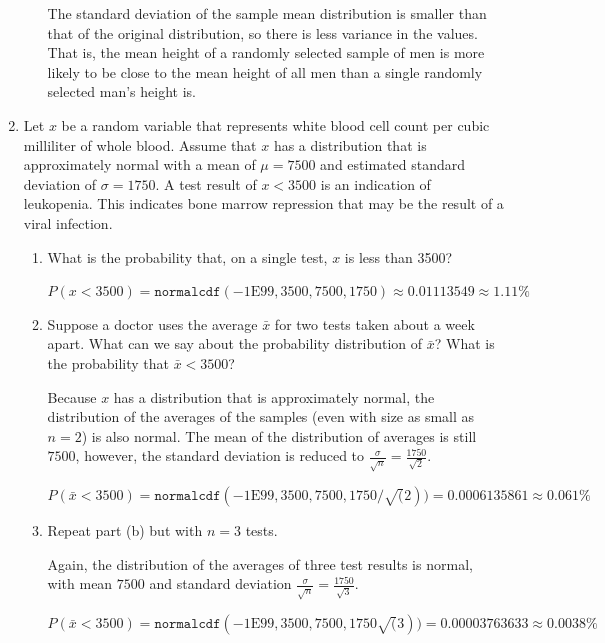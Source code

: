 \documentclass{article}
\newcommand{\answer}[1]{\color{white}#1}
\begin{document}
\begin{enumerate}
\begin{enumerate}
	{\answer The standard deviation of the sample mean distribution is smaller than that of the original distribution, so there is less variance in the values.  That is, the mean height of a randomly selected sample of men is more likely to be close to the mean height of all men than a single randomly selected man's height is.
	} 
	\end{enumerate}

	
\item Let $x$ be a random variable that represents white blood cell count per cubic milliliter of whole blood.  Assume that $x$ has a distribution that is approximately normal with a mean of $\mu = 7500$ and estimated standard deviation of $\sigma = 1750$.  A test result of $x<3500$ is an indication of leukopenia.  This indicates bone marrow repression that may be the result of a viral infection.

	\begin{enumerate}
	
	\item What is the probability that, on a single test, $x$ is less than 3500? 
	
	{\answer $P(x<3500) = \texttt{normalcdf}(-1\mbox{E}99, 3500, 7500, 1750) \approx 0.01113549 \approx 1.11\%$
	} 

	\item Suppose a doctor uses the average $\bar x$ for two tests taken about a week apart.  What can we say about the probability distribution of $\bar x$?  What is the probability that $\bar x < 3500$? 
	
	{\answer Because $x$ has a distribution that is approximately normal, the distribution of the averages of the samples (even with size as small as $n=2$) is also normal.  The mean of the distribution of averages is still $7500$, however, the standard deviation is reduced to $\frac{\sigma}{\sqrt{n}} = \frac{1750}{\sqrt{2}}.$ 
	
	$P(\bar{x} < 3500) = \texttt{normalcdf}(-1\mbox{E}99, 3500, 7500, 1750/\sqrt(2)) = 0.0006135861 \approx 0.061\%$
	} 

	\item Repeat part (b) but with $n=3$ tests. 
	
	{\answer Again, the distribution of the averages of three test results is normal, with mean $7500$ and standard deviation $\frac{\sigma}{\sqrt{n}} = \frac{1750}{\sqrt{3}}$. 
	
	$P(\bar{x} < 3500) = \texttt{normalcdf}(-1\mbox{E}99, 3500, 7500, 1750\sqrt(3)) = 0.00003763633 \approx 0.0038\%$
	} 


\end{enumerate}
\end{enumerate}
\end{document}
